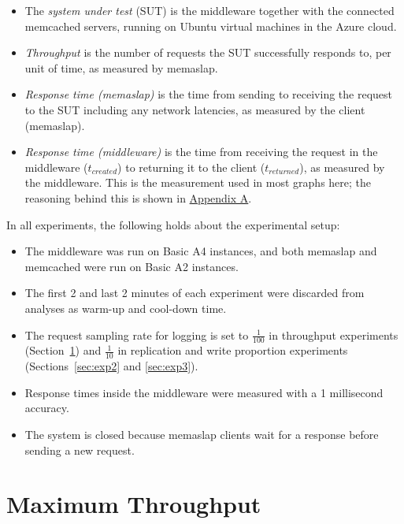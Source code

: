 \documentclass[11pt]{article}
\begin{document}
\begin{itemize}
\item The \emph{system under test} (SUT) is the middleware together with the connected memcached servers, running on Ubuntu virtual machines in the Azure cloud.
\item \emph{Throughput} is the number of requests the SUT successfully responds to, per unit of time, as measured by memaslap.
\item \emph{Response time (memaslap)} is the time from sending to receiving the request to the SUT including any network latencies, as measured by the client (memaslap).
\item \emph{Response time (middleware)} is the time from receiving the request in the middleware ($t_{created}$) to returning it to the client ($t_{returned}$), as measured by the middleware. This is the measurement used in most graphs here; the reasoning behind this is shown in \hyperref[sec:appa]{Appendix A}.
\end{itemize}

In all experiments, the following holds about the experimental setup:
\begin{itemize}
\item The middleware was run on Basic A4 instances, and both memaslap and memcached were run on Basic A2 instances.
\item The first 2 and last 2 minutes of each experiment were discarded from analyses as warm-up and cool-down time.
\item The request sampling rate for logging is set to $\frac{1}{100}$ in throughput experiments (Section~\ref{sec:exp1}) and $\frac{1}{10}$ in replication and write proportion experiments (Sections~\ref{sec:exp2} and \ref{sec:exp3}).
\item Response times inside the middleware were measured with a 1 millisecond accuracy.
\item The system is closed because memaslap clients wait for a response before sending a new request.
\end{itemize}


\clearpage
\section{Maximum Throughput}
\label{sec:exp1}
\end{document}
